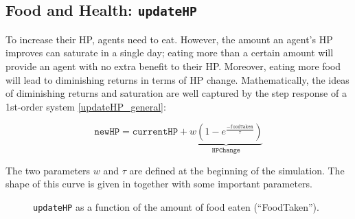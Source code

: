 \subsection{Food and Health: \texorpdfstring{\texttt{updateHP}}{updateHP}}\label{updateHP}
To increase their HP, agents need to eat. However, the amount an agent's HP improves can saturate in a single day; eating more than a certain amount will provide an agent with no extra benefit to their HP. Moreover, eating more food will lead to diminishing returns in terms of HP change. Mathematically, the ideas of diminishing returns and saturation are well captured by the step response of a 1st-order system \eqref{updateHP_general}:

\begin{equation}\label{updateHP_general}
   \texttt{newHP}= \texttt{currentHP} +\underbrace{w(1-e^{\frac{-\texttt{foodTaken}}{\tau}})}_{\texttt{HPChange}}
\end{equation}

The two parameters $w$ and $\tau$ are defined at the beginning of the simulation. The shape of this curve is given in  together with some important parameters.

\begin{figure}[htb]%
    \centering
    \qquad
    \caption{\texttt{updateHP} as a function of the amount of food eaten (``FoodTaken'').}%
    \label{fig:updateHP}%
\end{figure}

